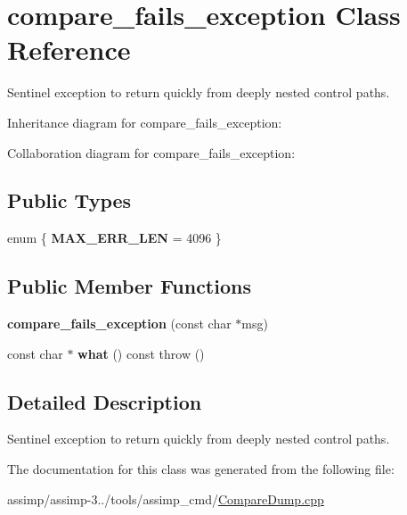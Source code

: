 \hypertarget{classcompare__fails__exception}{\section{compare\+\_\+fails\+\_\+exception Class Reference}
\label{classcompare__fails__exception}
}


Sentinel exception to return quickly from deeply nested control paths.  




Inheritance diagram for compare\+\_\+fails\+\_\+exception\+:


Collaboration diagram for compare\+\_\+fails\+\_\+exception\+:
\subsection*{Public Types}
\begin{DoxyCompactItemize}
\item 
\hypertarget{classcompare__fails__exception_aadff51fc369ce0175b2177c3bb764f8b}{enum \{ {\bfseries M\+A\+X\+\_\+\+E\+R\+R\+\_\+\+L\+E\+N} = 4096
 \}}\label{classcompare__fails__exception_aadff51fc369ce0175b2177c3bb764f8b}

\end{DoxyCompactItemize}
\subsection*{Public Member Functions}
\begin{DoxyCompactItemize}
\item 
\hypertarget{classcompare__fails__exception_a7cf8e3a8a0e8c6d0fc7f586c6b7ad6a4}{{\bfseries compare\+\_\+fails\+\_\+exception} (const char $\ast$msg)}\label{classcompare__fails__exception_a7cf8e3a8a0e8c6d0fc7f586c6b7ad6a4}

\item 
\hypertarget{classcompare__fails__exception_ad313e1021760da9344a89caac662797a}{const char $\ast$ {\bfseries what} () const   throw ()}\label{classcompare__fails__exception_ad313e1021760da9344a89caac662797a}

\end{DoxyCompactItemize}


\subsection{Detailed Description}
Sentinel exception to return quickly from deeply nested control paths. 

The documentation for this class was generated from the following file\+:\begin{DoxyCompactItemize}
\item 
assimp/assimp-\/3../tools/assimp\+\_\+cmd/\hyperlink{_compare_dump_8cpp}{Compare\+Dump.\+cpp}\end{DoxyCompactItemize}

